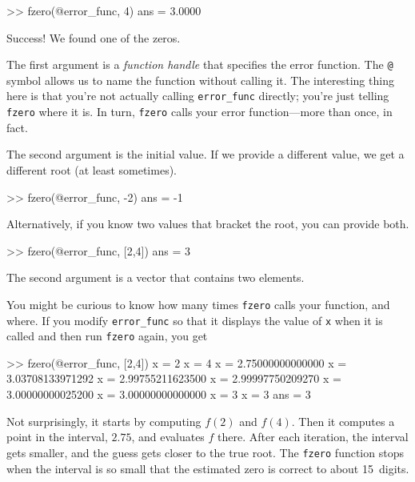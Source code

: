 \documentclass[../../book.tex]{subfiles}
\begin{document}
\begin{code}
>> fzero(@error_func, 4)
ans = 3.0000
\end{code}

Success!  We found one of the zeros.

The first argument is a \emph{function handle} that specifies
the error function.  The \lstinline{@} symbol allows us to name the
function without calling it.  The interesting thing here is
that you're not actually calling \lstinline{error_func} directly;
you're just telling \lstinline{fzero} where it is.  In turn, \lstinline{fzero}
calls your error function---more than once, in fact.


The second argument is the initial value.  If we provide a different
value, we get a different root (at least sometimes).

\begin{code}
>> fzero(@error_func, -2)
ans = -1
\end{code}

Alternatively, if you know two values that bracket the root,
you can provide both.

\begin{code}
>> fzero(@error_func, [2,4])
ans = 3
\end{code}

The second argument is a vector that contains two elements.


You might be curious to know how many times \lstinline{fzero} calls your
function, and where.  If you modify \lstinline{error_func} so that it displays
the value of \lstinline{x} when it is called and then run \lstinline{fzero}
again, you get

\begin{code}
>> fzero(@error_func, [2,4])
x = 2
x = 4
x = 2.75000000000000
x = 3.03708133971292
x = 2.99755211623500
x = 2.99997750209270
x = 3.00000000025200
x = 3.00000000000000
x = 3
x = 3
ans = 3
\end{code}

Not surprisingly, it starts by computing $f(2)$ and $f(4)$.  Then it computes a point in the interval, $2.75$, and evaluates $f$ there.  After each iteration, the interval gets smaller, and the guess gets closer to the true root.
The \lstinline{fzero} function stops when the interval is so small that the estimated
zero is correct to about 15~digits.
\end{document}
